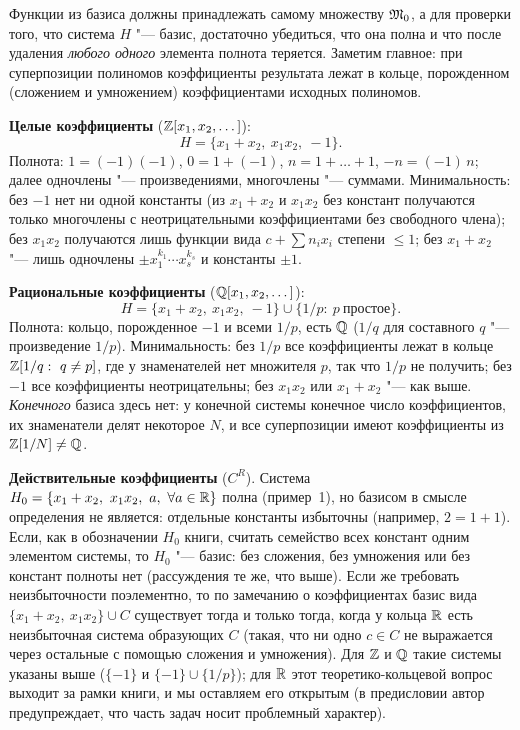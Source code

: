 \begin{solution}[7 (\S\,4)]
Функции из базиса должны принадлежать самому множеству $\mathfrak M_0$, а для
проверки того, что система $H$ "--- базис, достаточно убедиться, что она
полна и что после удаления \emph{любого одного} элемента полнота
теряется. Заметим главное: при суперпозиции полиномов коэффициенты
результата лежат в кольце, порожденном (сложением и умножением)
коэффициентами исходных полиномов.

\textbf{Целые коэффициенты} ($\mathbb Z[x_1,x_2,\dots]$):
\[
H=\{x_1+x_2,\ x_1x_2,\ -1\}.
\]
Полнота: $1=(-1)(-1)$, $0=1+(-1)$, $n=1+\dots+1$, $-n=(-1)\,n$; далее
одночлены "--- произведениями, многочлены "--- суммами. Минимальность:
без $-1$ нет ни одной константы (из $x_1+x_2$ и $x_1x_2$ без констант
получаются только многочлены с неотрицательными коэффициентами без
свободного члена); без $x_1x_2$ получаются лишь функции вида
$c+\sum n_ix_i$ степени $\le1$; без $x_1+x_2$ "--- лишь одночлены
$\pm x_1^{k_1}\cdots x_s^{k_s}$ и константы $\pm1$.

\textbf{Рациональные коэффициенты} ($\mathbb Q[x_1,x_2,\dots]$):
\[
H=\{x_1+x_2,\ x_1x_2,\ -1\}\cup\{1/p:\ p\ \text{простое}\}.
\]
Полнота: кольцо, порожденное $-1$ и всеми $1/p$, есть $\mathbb Q$
($1/q$ для составного $q$ "--- произведение $1/p$). Минимальность: без
$1/p$ все коэффициенты лежат в кольце $\mathbb Z[1/q:\ q\ne p]$, где у
знаменателей нет множителя $p$, так что $1/p$ не получить; без $-1$ все
коэффициенты неотрицательны; без $x_1x_2$ или $x_1+x_2$ "--- как выше.
\emph{Конечного} базиса здесь нет: у конечной системы конечное число
коэффициентов, их знаменатели делят некоторое $N$, и все суперпозиции
имеют коэффициенты из $\mathbb Z[1/N]\ne\mathbb Q$.

\textbf{Действительные коэффициенты} ($C^R$). Система
$H_0=\{x_1+x_2,\ x_1x_2,\ a,\ \forall a\in\mathbb R\}$ полна (пример~1), но
базисом в смысле определения не является: отдельные константы избыточны
(например, $2=1+1$). Если, как в обозначении $H_0$ книги, считать семейство
всех констант одним элементом системы, то $H_0$ "--- базис: без сложения,
без умножения или без констант полноты нет (рассуждения те же, что выше).
Если же требовать неизбыточности поэлементно, то по замечанию о
коэффициентах базис вида $\{x_1+x_2,\ x_1x_2\}\cup C$ существует тогда
и только тогда, когда у кольца $\mathbb R$ есть неизбыточная система
образующих $C$ (такая, что ни одно $c\in C$ не выражается через остальные
с помощью сложения и умножения). Для $\mathbb Z$ и $\mathbb Q$ такие системы указаны
выше ($\{-1\}$ и $\{-1\}\cup\{1/p\}$); для $\mathbb R$ этот теоретико-кольцевой
вопрос выходит за рамки книги, и мы оставляем его открытым (в предисловии
автор предупреждает, что часть задач носит проблемный характер).
\end{solution}
